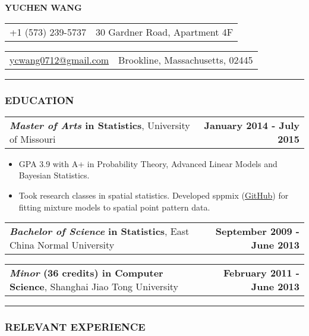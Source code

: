 \documentclass[11pt]{article}
\makeatletter
\newcommand{\headerrow}[2]
{\begin{tabular*}{\linewidth}{l@{\extracolsep{\fill}}r}
	#1 & #2 \\
\end{tabular*}
}
\makeatother
\begin{document}
\begin{center}
	\huge\textbf{YUCHEN WANG}
\end{center}
\noindent\headerrow{+1 (573) 239-5737}{30 Gardner Road, Apartment 4F}
\headerrow{\href{mailto:ycwang0712@gmail.com}{ycwang0712@gmail.com}}{Brookline, Massachusetts, 02445}

\vspace{-.8em}
\hrule

\subsubsection*{\centering EDUCATION}
\vspace{-.3em}

\headerrow
	{\textbf{\emph{Master of Arts} in Statistics}, University of Missouri}
	{\textbf{January 2014 - July 2015}}
	\begin{itemize}
		\item GPA 3.9 with A+ in Probability Theory, Advanced Linear Models and Bayesian Statistics.
		\item Took research classes in spatial statistics. Developed sppmix (\href{https://github.com/wangyuchen/sppmix}{GitHub}) for fitting mixture models to spatial point pattern data.
	\end{itemize}
\noindent\headerrow
	{\textbf{\emph{Bachelor of Science} in Statistics}, East China Normal University}
	{\textbf{September 2009 - June 2013}}
\noindent\headerrow
	{\textbf{\emph{Minor} (36 credits) in Computer Science}, Shanghai Jiao Tong University}
	{\textbf{February 2011 - June 2013}}


\vspace{-.8em}
\hrule


\subsubsection*{\centering RELEVANT EXPERIENCE}
\vspace{-.3em}
\end{document}

